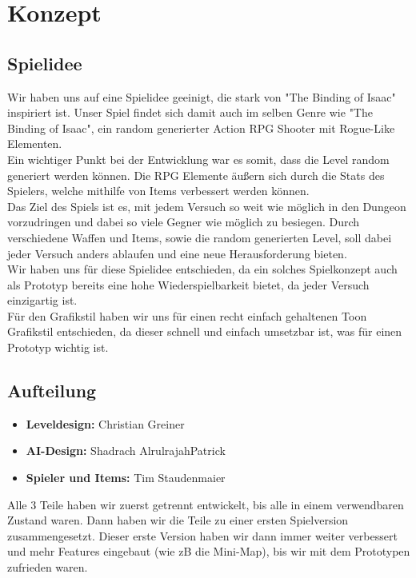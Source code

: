 \section{Konzept}

\subsection{Spielidee}
Wir haben uns auf eine Spielidee geeinigt, die stark von "The Binding of Isaac" inspiriert ist. Unser Spiel findet sich damit auch im selben Genre wie "The Binding of Isaac", ein random generierter Action RPG Shooter mit Rogue-Like Elementen.\\
Ein wichtiger Punkt bei der Entwicklung war es somit, dass die Level random generiert werden können. Die RPG Elemente äußern sich durch die Stats des Spielers, welche mithilfe von Items verbessert werden können. \\
Das Ziel des Spiels ist es, mit jedem Versuch so weit wie möglich in den Dungeon vorzudringen und dabei so viele Gegner wie möglich zu besiegen. Durch verschiedene Waffen und Items, sowie die random generierten Level, soll dabei jeder Versuch anders ablaufen und eine neue Herausforderung bieten.\\
Wir haben uns für diese Spielidee entschieden, da ein solches Spielkonzept auch als Prototyp bereits eine hohe Wiederspielbarkeit bietet, da jeder Versuch einzigartig ist.\\
Für den Grafikstil haben wir uns für einen recht einfach gehaltenen Toon Grafikstil entschieden, da dieser schnell und einfach umsetzbar ist, was für einen Prototyp wichtig ist.

\subsection{Aufteilung}
\begin{itemize}
\item \textbf{Leveldesign:} Christian Greiner
\item \textbf{AI-Design:} Shadrach AlrulrajahPatrick
\item \textbf{Spieler und Items:} Tim Staudenmaier
\end{itemize}
Alle 3 Teile haben wir zuerst getrennt entwickelt, bis alle in einem verwendbaren Zustand waren. Dann haben wir die Teile zu einer ersten Spielversion zusammengesetzt. Dieser erste Version haben wir dann immer weiter verbessert und mehr Features eingebaut (wie zB die Mini-Map), bis wir mit dem Prototypen zufrieden waren.

